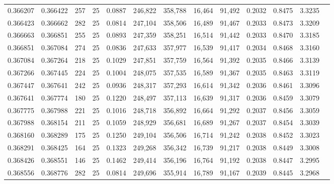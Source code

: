 \begin{tabular}{rrrrrrrrrrrrr}
0.366207 & 0.366422 &   257 &  25 &                                     0.0887 & 246,822 & 358,788 &  16,464 &  91,492 & 0.2032 & 0.8475 & 3.3235 \\
0.366423 & 0.366662 &   282 &  25 &                                     0.0814 & 247,104 & 358,506 &  16,489 &  91,467 & 0.2033 & 0.8473 & 3.3209 \\
0.366663 & 0.366851 &   255 &  25 &                                     0.0893 & 247,359 & 358,251 &  16,514 &  91,442 & 0.2033 & 0.8470 & 3.3185 \\
0.366851 & 0.367084 &   274 &  25 &                                     0.0836 & 247,633 & 357,977 &  16,539 &  91,417 & 0.2034 & 0.8468 & 3.3160 \\
0.367084 & 0.367264 &   218 &  25 &                                     0.1029 & 247,851 & 357,759 &  16,564 &  91,392 & 0.2035 & 0.8466 & 3.3139 \\
0.367266 & 0.367445 &   224 &  25 &                                     0.1004 & 248,075 & 357,535 &  16,589 &  91,367 & 0.2035 & 0.8463 & 3.3119 \\
0.367447 & 0.367641 &   242 &  25 &                                     0.0936 & 248,317 & 357,293 &  16,614 &  91,342 & 0.2036 & 0.8461 & 3.3096 \\
0.367641 & 0.367774 &   180 &  25 &                                     0.1220 & 248,497 & 357,113 &  16,639 &  91,317 & 0.2036 & 0.8459 & 3.3079 \\
0.367775 & 0.367988 &   221 &  25 &                                     0.1016 & 248,718 & 356,892 &  16,664 &  91,292 & 0.2037 & 0.8456 & 3.3059 \\
0.367988 & 0.368154 &   211 &  25 &                                     0.1059 & 248,929 & 356,681 &  16,689 &  91,267 & 0.2037 & 0.8454 & 3.3039 \\
0.368160 & 0.368289 &   175 &  25 &                                     0.1250 & 249,104 & 356,506 &  16,714 &  91,242 & 0.2038 & 0.8452 & 3.3023 \\
0.368291 & 0.368425 &   164 &  25 &                                     0.1323 & 249,268 & 356,342 &  16,739 &  91,217 & 0.2038 & 0.8449 & 3.3008 \\
0.368426 & 0.368551 &   146 &  25 &                                     0.1462 & 249,414 & 356,196 &  16,764 &  91,192 & 0.2038 & 0.8447 & 3.2995 \\
0.368556 & 0.368776 &   282 &  25 &                                     0.0814 & 249,696 & 355,914 &  16,789 &  91,167 & 0.2039 & 0.8445 & 3.2968 \\

\end{tabular}
